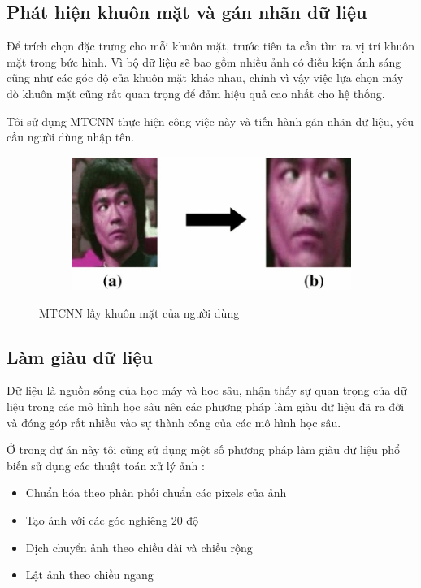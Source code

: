 \subsection{Phát hiện khuôn mặt và gán nhãn dữ liệu}
Để trích chọn đặc trưng cho mỗi khuôn mặt, trước tiên ta cần tìm ra
vị trí khuôn mặt trong bức hình. Vì bộ dữ liệu sẽ bao gồm nhiều ảnh
có điều kiện ánh sáng cũng như các góc độ của khuôn mặt khác nhau,
chính vì vậy việc lựa chọn máy dò khuôn mặt cũng rất quan trọng để đảm
hiệu quả cao nhất cho hệ thống.

Tôi sử dụng MTCNN thực hiện công việc này và tiến hành gán nhãn dữ liệu,
yêu cầu người dùng nhập tên.

\begin{figure}
    \begin{subfigure}{0.6\textwidth}
        \includegraphics[width=1\linewidth]{Chapters/items/chap3_3.jpg}
        \label{fig:chap3_3}
    \end{subfigure}
    \caption{MTCNN lấy khuôn mặt của người dùng}
\end{figure}

\subsection{Làm giàu dữ liệu}

Dữ liệu là nguồn sống của học máy và học sâu, nhận thấy sự quan trọng của dữ liệu
trong các mô hình học sâu nên các phương pháp làm giàu dữ liệu đã ra đời và đóng góp rất nhiều
vào sự thành công của các mô hình học sâu.

Ở trong dự án này tôi cũng sử dụng một số phương pháp làm giàu dữ liệu phổ biến sử dụng các thuật toán xử lý ảnh :
\begin{itemize}
    \item Chuẩn hóa theo phân phối chuẩn các pixels của ảnh
    \item Tạo ảnh với các góc nghiêng 20 độ 
    \item Dịch chuyển ảnh theo chiều dài và chiều rộng
    \item Lật ảnh theo chiều ngang
\end{itemize}

